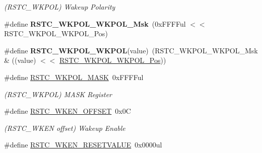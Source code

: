 \begin{DoxyCompactItemize}
\begin{DoxyCompactList}\small\item\em (R\+S\+T\+C\+\_\+\+W\+K\+P\+O\+L) Wakeup Polarity \end{DoxyCompactList}\item 
\hypertarget{group___s_a_m_l21___r_s_t_c_gac8634bb96f35f9373f1263e1270a7bbd}{}\#define {\bfseries R\+S\+T\+C\+\_\+\+W\+K\+P\+O\+L\+\_\+\+W\+K\+P\+O\+L\+\_\+\+Msk}~(0x\+F\+F\+F\+Ful $<$$<$ R\+S\+T\+C\+\_\+\+W\+K\+P\+O\+L\+\_\+\+W\+K\+P\+O\+L\+\_\+\+Pos)\label{group___s_a_m_l21___r_s_t_c_gac8634bb96f35f9373f1263e1270a7bbd}

\item 
\hypertarget{group___s_a_m_l21___r_s_t_c_ga244bd90885287e408672bf128c49a6be}{}\#define {\bfseries R\+S\+T\+C\+\_\+\+W\+K\+P\+O\+L\+\_\+\+W\+K\+P\+O\+L}(value)~(R\+S\+T\+C\+\_\+\+W\+K\+P\+O\+L\+\_\+\+W\+K\+P\+O\+L\+\_\+\+Msk \& ((value) $<$$<$ \hyperlink{group___s_a_m_l21___r_s_t_c_ga4559fc834c50f37469c9d9b5dd88dcdb}{R\+S\+T\+C\+\_\+\+W\+K\+P\+O\+L\+\_\+\+W\+K\+P\+O\+L\+\_\+\+Pos}))\label{group___s_a_m_l21___r_s_t_c_ga244bd90885287e408672bf128c49a6be}

\item 
\hypertarget{group___s_a_m_l21___r_s_t_c_ga38b1a20e79a899b95e80f25b3739db6b}{}\#define \hyperlink{group___s_a_m_l21___r_s_t_c_ga38b1a20e79a899b95e80f25b3739db6b}{R\+S\+T\+C\+\_\+\+W\+K\+P\+O\+L\+\_\+\+M\+A\+S\+K}~0x\+F\+F\+F\+Ful\label{group___s_a_m_l21___r_s_t_c_ga38b1a20e79a899b95e80f25b3739db6b}

\begin{DoxyCompactList}\small\item\em (R\+S\+T\+C\+\_\+\+W\+K\+P\+O\+L) M\+A\+S\+K Register \end{DoxyCompactList}\item 
\hypertarget{group___s_a_m_l21___r_s_t_c_ga3556bc7877a1bf3883bb2a4ef3e1a498}{}\#define \hyperlink{group___s_a_m_l21___r_s_t_c_ga3556bc7877a1bf3883bb2a4ef3e1a498}{R\+S\+T\+C\+\_\+\+W\+K\+E\+N\+\_\+\+O\+F\+F\+S\+E\+T}~0x0\+C\label{group___s_a_m_l21___r_s_t_c_ga3556bc7877a1bf3883bb2a4ef3e1a498}

\begin{DoxyCompactList}\small\item\em (R\+S\+T\+C\+\_\+\+W\+K\+E\+N offset) Wakeup Enable \end{DoxyCompactList}\item 
\hypertarget{group___s_a_m_l21___r_s_t_c_ga627d9a418abea005ea3f0e9d52940bc2}{}\#define \hyperlink{group___s_a_m_l21___r_s_t_c_ga627d9a418abea005ea3f0e9d52940bc2}{R\+S\+T\+C\+\_\+\+W\+K\+E\+N\+\_\+\+R\+E\+S\+E\+T\+V\+A\+L\+U\+E}~0x0000ul\label{group___s_a_m_l21___r_s_t_c_ga627d9a418abea005ea3f0e9d52940bc2}


\end{DoxyCompactItemize}
